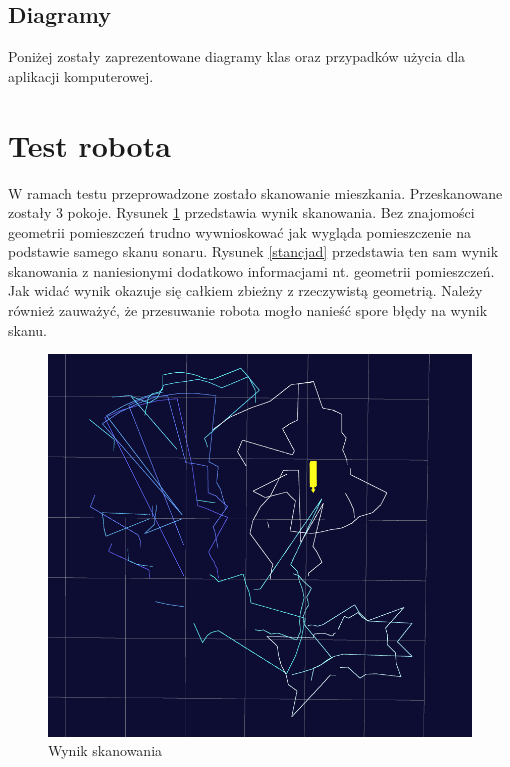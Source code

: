 \documentclass[a4paper]{article}
\begin{document}
\subsection{Diagramy}
Poniżej zostały zaprezentowane diagramy klas oraz przypadków użycia dla aplikacji komputerowej.



\section{Test robota}
W ramach testu przeprowadzone zostało skanowanie mieszkania. Przeskanowane zostały 3 pokoje. Rysunek \ref{stancjac} przedstawia wynik skanowania. Bez znajomości geometrii pomieszczeń trudno wywnioskować jak wygląda pomieszczenie na podstawie samego skanu sonaru. Rysunek \ref{stancjad} przedstawia ten sam wynik skanowania z naniesionymi dodatkowo informacjami nt. geometrii pomieszczeń. Jak widać wynik okazuje się całkiem zbieżny z rzeczywistą geometrią. Należy również zauważyć, że przesuwanie robota mogło nanieść spore błędy na wynik skanu. 
\begin{figure}[p]
\centering
\includegraphics[width=\linewidth]{stancjac.png}
\caption{Wynik skanowania}
\label{stancjac}
\end{figure}
\end{document}
